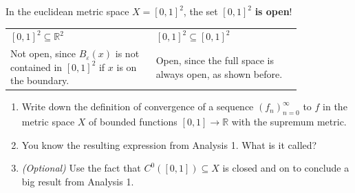 \begin{importantremark}
\label{rem:common_misconception}
In the euclidean metric space $X = [0,1]^2$, the set $[0,1]^2$ \textbf{is open}!
\begin{center}
\begin{tabular}{p{0.42\linewidth} p{0.42\linewidth}}
\textbf{$[0,1]^2 \subseteq \mathbb{R}^2$} & \textbf{$[0,1]^2 \subseteq [0,1]^2$} \\
Not open, since $B_\varepsilon(x)$ is not contained in $[0,1]^2$ if $x$ is on the boundary. &
Open, since the full space is always open, as shown before.
\end{tabular}
\end{center}
\end{importantremark}

\begin{center}
\end{center}

\begin{exercise}
\label{ex:uniform_convergence}
\begin{enumerate}[label=\textbf{(\alph*)}]
  \item Write down the definition of convergence of a sequence $(f_n)_{n=0}^{\infty}$ to $f$ in
    the metric space $X$ of bounded functions $[0,1] \to \mathbb{R}$ with the supremum metric.
  \item You know the resulting expression from Analysis 1. What is it called?
  \item \textit{(Optional)} Use the fact that $C^0([0,1]) \subseteq X$ is closed and
     on  to conclude a big result
    from Analysis 1.
\end{enumerate}
\end{exercise}


